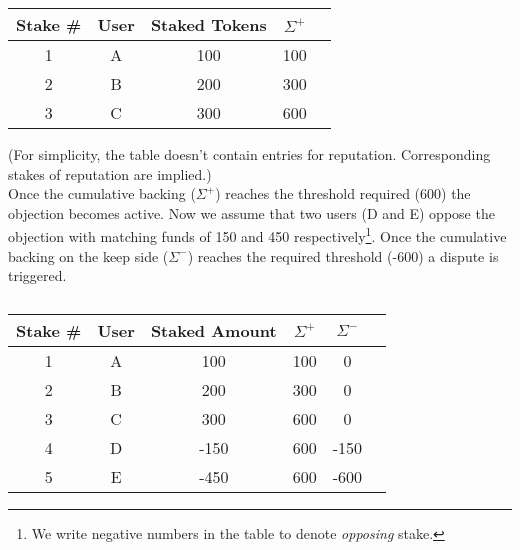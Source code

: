 \begin{table}[h]
\centering
\caption{}
\begin{tabular}{|c|c|c|c|c|}
\hline
Stake \# & User  & Staked Tokens & $\Sigma^+$ \\ \hline
1 & A & 100           & 100                                                                                          \\ \hline
2 & B & 200           & 300                                                                                           \\ \hline
3 & C & 300           & 600                                                                                           \\ \hline
\end{tabular}
\end{table}
(For simplicity, the table doesn't contain entries for reputation. Corresponding stakes of reputation are implied.)\\
Once the cumulative backing ($\Sigma^+$) reaches the threshold required (600) the objection becomes active. Now we assume that two users (D and E) oppose the objection with matching funds of 150 and 450 respectively\footnote{We write negative numbers in the table to denote \emph{opposing} stake.}. Once the cumulative backing on the keep side ($\Sigma^-$) reaches the required threshold (-600) a dispute is triggered.

\begin{table}[h]
\centering
\caption{}
\begin{tabular}{|c|c|c|c|c|c|}
\hline
Stake \# & User  & Staked Amount & $\Sigma^+$ & $\Sigma^-$ \\ \hline
1 & A & 100           & 100                      & 0                                                                       \\ \hline
2 & B & 200           & 300                      & 0                                                                       \\ \hline
3 & C & 300           & 600                      & 0                                                                       \\ \hline
4 & D & -150          & 600                      & -150                                                                    \\ \hline
5 & E & -450          & 600                      & -600                                                                    \\ \hline
\end{tabular}
\end{table}


